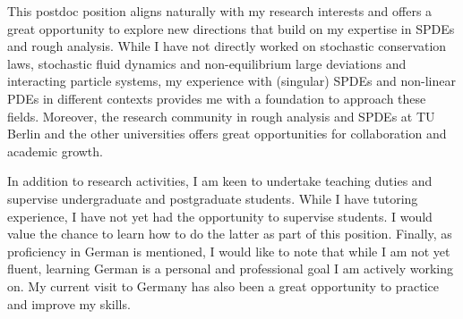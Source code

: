 \documentclass[11pt,a4paper]{moderncv}
\begin{document}
This postdoc position aligns naturally with my research interests and offers a great opportunity to explore new directions that build on my expertise in SPDEs and rough analysis. While I have not directly worked on stochastic conservation laws, stochastic fluid dynamics and non-equilibrium large deviations and interacting particle systems, my experience with (singular) SPDEs and non-linear PDEs in different contexts provides me with a foundation to approach these fields.  Moreover, the research community in rough analysis and SPDEs at TU Berlin and the other universities offers great opportunities for collaboration and academic growth.
%
%


In addition to research activities, I am keen to undertake teaching duties and supervise undergraduate and postgraduate students. While I have tutoring experience, I have not yet had the opportunity to supervise students. I would value the chance to learn how to do the latter as part of this position. Finally, as proficiency in German is mentioned, I would like to note that while I am not yet fluent, learning German is a personal and professional goal I am actively working on.  My current visit to Germany has also been a great opportunity to practice and improve my skills.







\end{document}
